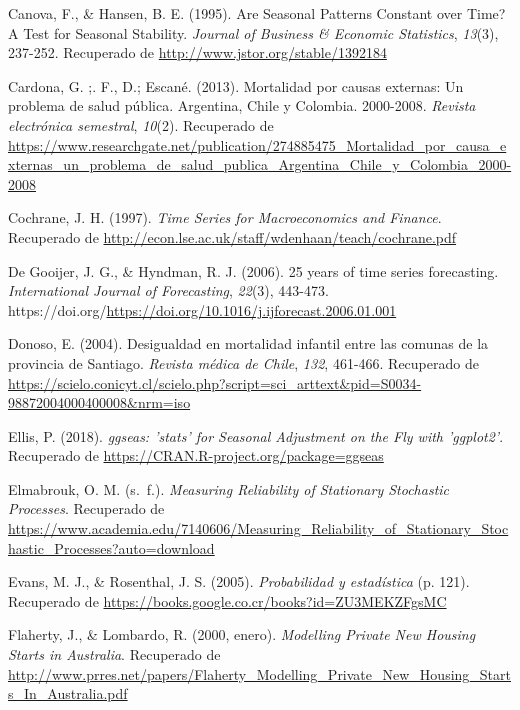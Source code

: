 \documentclass[
]{article}
\newlength{\cslhangindent}
\newlength{\cslentryspacingunit} %
\newenvironment{CSLReferences}[2] %
 {%
  \setlength{\parindent}{0pt}
  \ifodd #1
  \let\oldpar\par
  \def\par{\hangindent=\cslhangindent\oldpar}
  \fi
  \setlength{\parskip}{#2\cslentryspacingunit}
 }%
 {}
\begin{document}
\begin{CSLReferences}{1}{0}
\leavevmode{}%
Canova, F., \& Hansen, B. E. (1995). Are Seasonal Patterns Constant over
Time? A Test for Seasonal Stability. \emph{Journal of Business \&
Economic Statistics}, \emph{13}(3), 237-252. Recuperado de
\url{http://www.jstor.org/stable/1392184}

\leavevmode{}%
Cardona, G. ;. F., D.; Escané. (2013). Mortalidad por causas externas:
Un problema de salud pública. Argentina, Chile y Colombia. 2000-2008.
\emph{Revista electrónica semestral}, \emph{10}(2). Recuperado de
\url{https://www.researchgate.net/publication/274885475_Mortalidad_por_causa_externas_un_problema_de_salud_publica_Argentina_Chile_y_Colombia_2000-2008}

\leavevmode{}%
Cochrane, J. H. (1997). \emph{Time Series for Macroeconomics and
Finance}. Recuperado de
\url{http://econ.lse.ac.uk/staff/wdenhaan/teach/cochrane.pdf}

\leavevmode{}%
De Gooijer, J. G., \& Hyndman, R. J. (2006). 25 years of time series
forecasting. \emph{International Journal of Forecasting}, \emph{22}(3),
443-473.
https://doi.org/\url{https://doi.org/10.1016/j.ijforecast.2006.01.001}

\leavevmode{}%
Donoso, E. (2004). Desigualdad en mortalidad infantil entre las comunas
de la provincia de Santiago. \emph{Revista médica de Chile}, \emph{132},
461-466. Recuperado de
\url{https://scielo.conicyt.cl/scielo.php?script=sci_arttext\&pid=S0034-98872004000400008\&nrm=iso}

\leavevmode{}%
Ellis, P. (2018). \emph{ggseas: 'stats' for Seasonal Adjustment on the
Fly with 'ggplot2'}. Recuperado de
\url{https://CRAN.R-project.org/package=ggseas}

\leavevmode{}%
Elmabrouk, O. M. (s.~f.). \emph{Measuring Reliability of Stationary
Stochastic Processes}. Recuperado de
\url{https://www.academia.edu/7140606/Measuring_Reliability_of_Stationary_Stochastic_Processes?auto=download}

\leavevmode{}%
Evans, M. J., \& Rosenthal, J. S. (2005). \emph{Probabilidad y
estadística} (p. 121). Recuperado de
\url{https://books.google.co.cr/books?id=ZU3MEKZFgsMC}

\leavevmode{}%
Flaherty, J., \& Lombardo, R. (2000, enero). \emph{Modelling Private New
Housing Starts in Australia}. Recuperado de
\url{http://www.prres.net/papers/Flaherty_Modelling_Private_New_Housing_Starts_In_Australia.pdf}


\end{CSLReferences}
\end{document}
